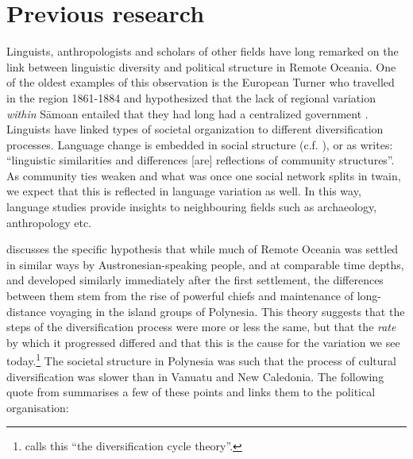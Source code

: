 \documentclass[12pt,letterpaper]{article}
\begin{document}

\FloatBarrier
\section{Previous research}
\label{sec:previous_research}
Linguists, anthropologists and scholars of other fields have long remarked on the link between linguistic diversity and political structure in Remote Oceania. One of the oldest examples of this observation is the European Turner who travelled in the region 1861-1884 and hypothesized that the lack of regional variation \emph{within} S\={a}moan entailed that they had long had a centralized government \citep[172]{turner1884}. Linguists have linked types of societal organization to different diversification processes. Language change is embedded in social structure (c.f. \citep{WLH1968}), or as \citet[124]{grace_1992_aberrant} writes: ``linguistic similarities and differences [are] reflections of community structures''. As community ties weaken and what was once one social network splits in twain, we expect that this is reflected in language variation as well. In this way, language studies provide insights to neighbouring fields such as archaeology, anthropology etc.

\citet{pawley81, pawley2007} discusses the specific hypothesis that while much of Remote Oceania was settled in similar ways by Austronesian-speaking people, and at comparable time depths, and developed similarly immediately after the first settlement, the differences between them stem from the rise of powerful chiefs and maintenance of long-distance voyaging in the island groups of Polynesia. This theory suggests that the steps of the diversification process were more or less the same, but that the \emph{rate} by which it progressed differed and that this is the cause for the variation we see today.\footnote{\citet{lynch1981melanesian} calls this ``the diversification cycle theory''.} The societal structure in Polynesia was such that the process of cultural diversification was slower than in Vanuatu and New Caledonia. The following quote from \citet{pawley2007} summarises a few of these points and links them to the political organisation:

\end{document}
